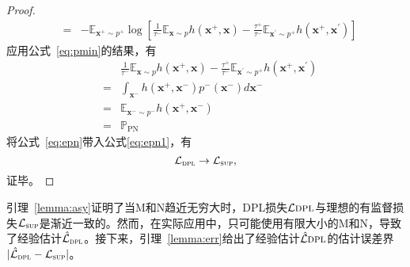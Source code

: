 \begin{lemma}
\begin{proof}
\begin{eqnarray}
			&=&-\mathbb{E}_{\mathbf{x}^+\sim p^+}\log [\frac{1}{\tau^-}\mathbb{E}_{\mathbf{x}\sim p}h(\mathbf{x}^+,\mathbf{x}) \label{eq:lepn}- \frac{\tau^+}{\tau^-}\mathbb{E}_{\mathbf{x}^\prime\sim p^+}h(\mathbf{x}^+, \mathbf{x}^\prime)] \label{eq:epn1}
		\end{eqnarray}
应用公式~\eqref{eq:pmin}的结果，有
		\begin{eqnarray}
			&&\frac{1}{\tau^-}\mathbb{E}_{\mathbf{x}\sim p}h(\mathbf{x}^+,\mathbf{x}) - \frac{\tau^+}{\tau^-}\mathbb{E}_{\mathbf{x}^\prime\sim p^+}h(\mathbf{x}^+, \mathbf{x}^\prime)\nonumber \\
			&=& \int_\mathbf{x^-}h(\mathbf{x}^+,\mathbf{x}^-)p^-(\mathbf{x}^-)d\mathbf{x}^- \nonumber \\
			&=& \mathbb{E}_{\mathbf{x}^-\sim p^-}h(\mathbf{x}^+,\mathbf{x}^-) \nonumber\\
			&=&\mathbb{P}_\text{PN} \label{eq:epn}
		\end{eqnarray}
将公式~\eqref{eq:epn}带入公式\eqref{eq:epn1}，有
		\[\mathcal{L}_\textsc{dpl}  \rightarrow \mathcal{L}_\textsc{sup},\]
证毕。
	\end{proof}
	
引理~\ref{lemma:asy}证明了当M和N趋近无穷大时，DPL损失$\mathcal{L}\textsc{dpl}$与理想的有监督损失$\mathcal{L}_\textsc{sup}$是渐近一致的。然而，在实际应用中，只可能使用有限大小的M和N，导致了经验估计$\hat{\mathcal{L}}_\textsc{dpl}$。接下来，引理~\ref{lemma:err}给出了经验估计$\hat{\mathcal{L}}\textsc{dpl}$的估计误差界$|\hat{\mathcal{L}}_\textsc{dpl}-\mathcal{L}_\textsc{sup}|$。
\end{lemma}
